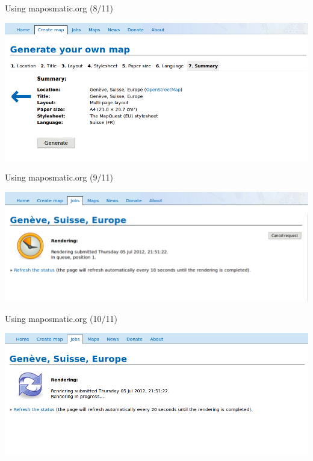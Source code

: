\documentclass{beamer}
\begin{document}
\begin{frame}{Using maposmatic.org (8/11)}
  \begin{center}
    \includegraphics[width=\textwidth]{screenshot8.png}
  \end{center}
\end{frame}

\begin{frame}{Using maposmatic.org (9/11)}
  \begin{center}
    \includegraphics[width=\textwidth]{screenshot9.png}
  \end{center}
\end{frame}

\begin{frame}{Using maposmatic.org (10/11)}
  \begin{center}
    \includegraphics[width=\textwidth]{screenshot10.png}
  \end{center}
\end{frame}
\end{document}
